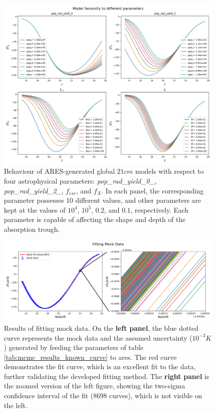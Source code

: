 \documentclass[12pt, TexShade, letterpaper]{report}
\begin{document}
\begin{figure}[h!]
\centering
\includegraphics[scale =0.5]{sensivity.png}
\caption[Behaviour of global $21cm$ theoretical model with respect to underlying astrophysical parameters]{Behaviour of ARES-generated global $21cm$ models with respect to four astrophysical parameters: \emph{pop\_rad\_yield\_0\_}, \emph{pop\_rad\_yield\_2\_}, $f_{esc}$, and $f_X$. In each panel, the corresponding parameter possesses 10 different values, and other parameters are kept at the values of  $10^4$, $10^5$, $0.2$, and $0.1$, respectively. Each parameter is capable of affecting the shape and depth of the absorption trough.}
\label{fig:sensivity}
\end{figure}
\begin{figure}[h!]
\centering
\includegraphics[scale =0.7]{fit_curve_mock.png}
\caption[Results of fitting mock data]{Results of fitting mock data. On the \textbf{left panel}, the blue dotted curve represents the mock data and the assumed uncertainty ($10^{-3}K$) generated by feeding the parameters of table \ref{tab:mcmc_results_known_curve} to \gls{ares}. The red curve demonstrates the fit curve, which is an excellent fit to the data, further validating the developed fitting method. The \textbf{right panel} is the zoomed version of the left figure, showing the two-sigma confidence interval of the fit (8698 curves), which is not visible on the left.}
\label{fig:fit_curve_known_curve}
\end{figure}
\end{document}

